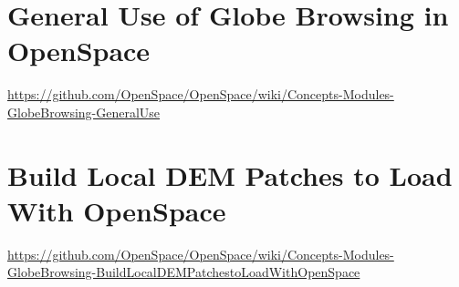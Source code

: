 \begin{appendices}

\chapter{General Use of Globe Browsing in OpenSpace}
\label{appendix:generaluse}
\begin{sloppypar}
\url{https://github.com/OpenSpace/OpenSpace/wiki/Concepts-Modules-GlobeBrowsing-GeneralUse}
\end{sloppypar}

\chapter{Build Local DEM Patches to Load With OpenSpace}
\label{appendix:localpatches}
\begin{sloppypar}
\url{https://github.com/OpenSpace/OpenSpace/wiki/Concepts-Modules-GlobeBrowsing-BuildLocalDEMPatchestoLoadWithOpenSpace}
\end{sloppypar}

\end{appendices}